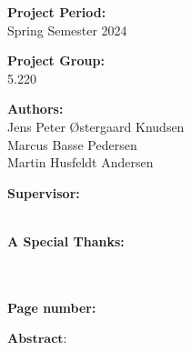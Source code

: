 \begin{titlepage}
\begin{minipage}[t]{0.48\textwidth}

\textbf{Project Period:} \\[5pt] \hspace*{2ex}
\hspace*{-13pt}Spring Semester 2024 \\\hspace*{2ex}

\textbf{Project Group:} \\[5pt]\bigskip\hspace{2ex}
\hspace*{-13pt}5.220	

\textbf{Authors:} \\[5pt]\hspace*{2ex}\hspace*{-13pt}
Jens Peter Østergaard Knudsen \\ \hspace*{2ex}
\hspace*{-13pt}Marcus Basse Pedersen \\\hspace*{2ex}
\hspace*{-13pt}Martin Husfeldt Andersen \\\hspace*{2ex}
\space 

\textbf{Supervisor:} \\[5pt]\hspace*{2ex}\hspace*{-13pt} 
 \hspace*{-13pt}
 \\\hspace*{2ex}
 
 \textbf{A Special Thanks:} \\[5pt]\hspace*{2ex}\hspace*{-13pt}

 \hspace*{-13pt}
 \\\hspace*{2ex}\\
\textbf{Page number: \pageref{LastPage}
} \\ 


\end{minipage}
\hfill
\begin{minipage}[t]{0.483\textwidth}

$\textbf{Abstract:}$ \\[5pt]
\fbox{\parbox{7cm}{}}
\end{minipage}

\vfill

\end{titlepage}
